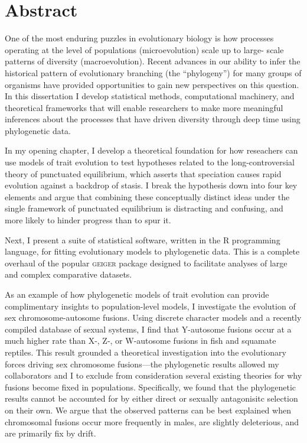 \chapter*{Abstract}

One of the most enduring puzzles in evolutionary biology is how processes operating at the level of populations (microevolution) scale up to large-
scale patterns of diversity (macroevolution). Recent advances in our ability to infer the historical pattern of evolutionary branching (the ``phylogeny'') for many groups of organisms have provided opportunities to gain new perspectives on this question. In this dissertation I develop statistical methods, computational machinery, and theoretical frameworks that will enable researchers to make more meaningful inferences about the processes that have driven diversity through deep time using phylogenetic data.

In my opening chapter, I develop a theoretical foundation for how reseachers can use models of trait evolution to test hypotheses related to the long-controversial theory of punctuated equilibrium, which asserts that speciation causes rapid evolution against a backdrop of stasis. I break the hypothesis down into four key elements and argue that combining these conceptually distinct ideas under the single framework of punctuated equilibrium is distracting and confusing, and more likely to hinder progress than to spur it. 

Next, I present a suite of statistical software, written in the R programming language, for fitting evolutionary models to phylogenetic data. This is a complete overhaul of the popular \textsc{geiger} package designed to facilitate analyses of large and complex comparative datasets.

As an example of how phylogenetic models of trait evolution can provide complimentary insights to population-level models, I investigate the evolution of sex chromosome-autosome fusions. Using discrete character models and a recently compiled database of sexual systems, I find that Y-autosome fusions occur at a much higher rate than X-, Z-, or W-autosome fusions in fish and squamate reptiles. This result grounded a theoretical investigation into the evolutionary forces driving sex chromosome fusions---the phylogenetic results allowed my collaborators and I to exclude from consideration several existing theories for why fusions become fixed in populations. Specifically, we found that the phylogenetic results cannot be accounted for by either direct or sexually antagonisitc selection on their own. We argue that the observed patterns can be best explained when chromosomal fusions occur more frequently in males, are slightly deleterious, and are primarily fix by drift.

